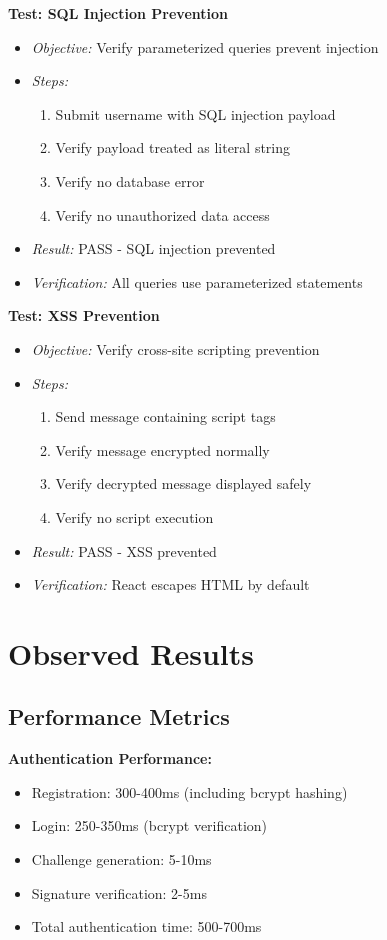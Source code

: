 \textbf{Test: SQL Injection Prevention}
\begin{itemize}
    \item \textit{Objective:} Verify parameterized queries prevent injection
    \item \textit{Steps:}
    \begin{enumerate}
        \item Submit username with SQL injection payload
        \item Verify payload treated as literal string
        \item Verify no database error
        \item Verify no unauthorized data access
    \end{enumerate}
    \item \textit{Result:} PASS - SQL injection prevented
    \item \textit{Verification:} All queries use parameterized statements
\end{itemize}

\textbf{Test: XSS Prevention}
\begin{itemize}
    \item \textit{Objective:} Verify cross-site scripting prevention
    \item \textit{Steps:}
    \begin{enumerate}
        \item Send message containing script tags
        \item Verify message encrypted normally
        \item Verify decrypted message displayed safely
        \item Verify no script execution
    \end{enumerate}
    \item \textit{Result:} PASS - XSS prevented
    \item \textit{Verification:} React escapes HTML by default
\end{itemize}

\section{Observed Results}

\subsection{Performance Metrics}

\textbf{Authentication Performance:}
\begin{itemize}
    \item Registration: 300-400ms (including bcrypt hashing)
    \item Login: 250-350ms (bcrypt verification)
    \item Challenge generation: 5-10ms
    \item Signature verification: 2-5ms
    \item Total authentication time: 500-700ms
\end{itemize}

